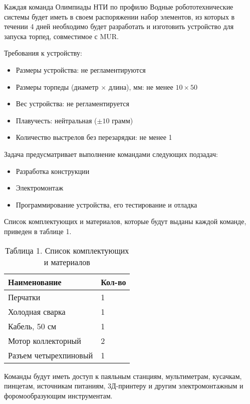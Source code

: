 
Каждая команда Олимпиады НТИ по профилю Водные робототехнические системы будет иметь в своем распоряжении набор элементов, из которых в течении 4 дней необходимо будет разработать и изготовить устройство для запуска торпед, совместимое с MUR. 

Требования к устройству:
\begin{itemize}
    \item Размеры устройства: не регламентируются
    \item Размеры торпеды (диаметр $\times$ длина), мм: не менее $10 \times 50$
    \item Вес устройства: не регламентируется
    \item Плавучесть: нейтральная ($\pm 10$ грамм)
    \item Количество выстрелов без перезарядки: не менее 1
\end{itemize}

Задача предусматривает выполнение командами следующих подзадач:
\begin{itemize}
    \item Разработка конструкции
    \item Электромонтаж 
    \item Программирование устройства, его тестирование и отладка
\end{itemize}

Список комплектующих и материалов, которые будут выданы каждой команде, приведен в таблице 1.

\begin{table}[H]
    \center
    \caption{Таблица 1. Список комплектующих и материалов}
    \begin{tabular}{|l|l|}
        \hline
        \textbf{Наименование} & \textbf{Кол-во} \\
        \hline
        Перчатки & 1 \\
        \hline
        Холодная сварка & 1 \\
        \hline
        Кабель, 50 см & 1 \\
        \hline
        Мотор коллекторный & 2 \\
        \hline
        Разъем четырехпиновый & 1 \\
        \hline
    \end{tabular}
\end{table}

Команды будут иметь доступ к паяльным станциям, мультиметрам, кусачкам, пинцетам, источникам питаниям, 3Д-принтеру и другим электромонтажным и форомообразующим инструментам. 

